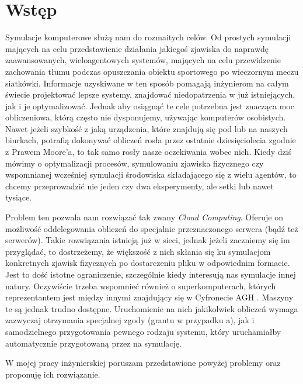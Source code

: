 \chapter{Wstęp}
\label{cha:wstep}

\par Symulacje komputerowe służą nam do rozmaitych celów. Od prostych symulacji mających na celu przedstawienie działania jakiegoś zjawiska do naprawdę zaawansowanych, wieloagentowych systemów, mających na celu przewidzenie zachowania tłumu podczas opuszczania obiektu sportowego po wieczornym meczu siatkówki. Informacje uzyskiwane w ten sposób pomagają inżynierom na całym świecie projektować lepsze systemy, znajdować niedopatrzenia w już istniejących, jak i je optymalizować. Jednak aby osiągnąć te cele potrzebna jest znacząca moc obliczeniowa, którą często nie dysponujemy, używając komputerów osobistych. Nawet jeżeli szybkość z jaką urządzenia, które znajdują się pod lub na naszych biurkach, potrafią dokonywać obliczeń rosła przez ostatnie dziesięciolecia zgodnie z Prawem Moore'a,\cite{mollick2006establishing} to tak samo rosły nasze oczekiwania wobec nich. Kiedy dziś mówimy o optymalizacji procesów, symulowaniu zjawiska fizycznego czy wspomnianej wcześniej symulacji środowiska składającego się z wielu agentów, to chcemy przeprowadzić nie jeden czy dwa eksperymenty, ale setki lub nawet tysiące.

\par Problem ten pozwala nam rozwiązać tak zwany \emph{Cloud Computing}. Oferuje on możliwość oddelegowania obliczeń do specjalnie przeznaczonego serwera (bądź też serwerów). Takie rozwiązania istnieją już w sieci, jednak jeżeli zaczniemy się im przyglądać, to dostrzeżemy, że większość z nich skłania się ku symulacjom konkretnych zjawisk fizycznych po dostarczeniu pliku w odpowiednim formacie. Jest to dość istotne ograniczenie, szczególnie kiedy interesują nas symulacje innej natury. Oczywiście trzeba wspomnieć również o superkomputerach, których reprezentantem jest między innymi znajdujący się w Cyfronecie AGH \emph{\prometheusAgh{}}. Maszyny te są jednak trudno dostępne. Uruchomienie na nich jakikolwiek obliczeń wymaga zazwyczaj otrzymania specjalnej zgody (grantu w przypadku \emph{\prometheusAgh{}}a), jak i samodzielnego przygotowania pewnego rodzaju systemu, który uruchamiałby automatycznie przygotowaną przez na symulację.

\par W mojej pracy inżynierskiej poruszam przedstawione powyżej problemy oraz proponuję ich rozwiązanie.

